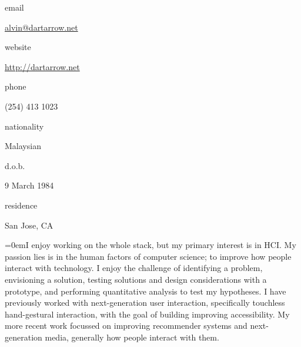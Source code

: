 \documentclass[a4paper]{scrartcl}
\newcommand{\Columize}[2]{\noindent \parbox{2cm}{{#1}} {#2} } %
\newcommand{\Description}[1]{\hangindent=0em\hangafter=0\noindent\footnotesize{#1}\par\normalsize\vspace{1em}} %
\newcommand{\Redvline}[0]{\vspace{0.5em}\noindent{\color{ThemeColor}\rule{16cm}{0.4pt}}}
\newcommand{\MyName}[1]{\noindent{\textsc{\LARGE{\color{ThemeColor}#1}}}} %
\newcommand{\BlockTitle}[1]{\textsc{\vspace{0.15em}}\noindent{\spacedlowsmallcaps{#1}}\vspace{1em}}
\begin{document}
\thispagestyle{empty} %


\MyName{Alvin Jude} %

\vspace{-0.3em}

\Redvline

\begin{multicols}{2}
\Columize{email}{\href{mailto:alvin@dartarrow.net}{alvin@dartarrow.net}} %

\Columize{website}{\href{http://dartarrow.net}{http://dartarrow.net}} %

\Columize{phone}{(254) 413 1023 } %

\columnbreak

\Columize{nationality}{Malaysian}

\Columize{d.o.b.}{9 March 1984} 

\Columize{residence}{San Jose, CA} 




\end{multicols}

\vspace{1em} %


\Description{I enjoy working on the whole stack, but my primary interest is in HCI. My passion lies is in the human factors of computer science; to improve how people interact with technology. I enjoy the challenge of identifying a problem, envisioning a solution, testing solutions and design considerations with a prototype, and performing quantitative analysis to test my hypotheses. I have previously worked with next-generation user interaction, specifically touchless hand-gestural interaction, with the goal of building improving accessibility. My more recent work focussed on improving recommender systems and next-generation media, generally how people interact with them. } 

\Redvline
\end{document}
